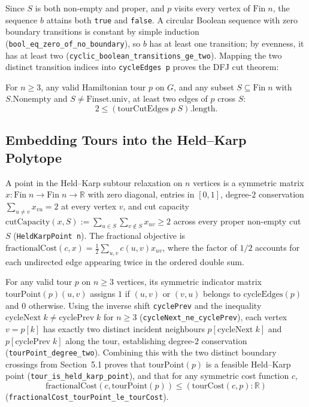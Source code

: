 Since $S$ is both non-empty and proper, and $p$ visits every vertex of $\mathrm{Fin}\;n$, the sequence $b$ attains both \texttt{true} and \texttt{false}. A circular Boolean sequence with zero boundary transitions is constant by simple induction (\texttt{bool\_eq\_zero\_of\_no\_boundary}), so $b$ has at least one transition; by evenness, it has at least two (\texttt{cyclic\_boolean\_transitions\_ge\_two}). Mapping the two distinct transition indices into \texttt{cycleEdges p} proves the DFJ cut theorem:
\begin{theorem}
For $n \ge 3$, any valid Hamiltonian tour $p$ on $G$, and any subset $S \subseteq \mathrm{Fin}\;n$ with $S.\mathrm{Nonempty}$ and $S \ne \mathrm{Finset.univ}$, at least two edges of $p$ cross $S$:
\[
  2 \le (\mathrm{tourCutEdges}\;p\;S).\mathrm{length}.
\]
\end{theorem}

\subsection{Embedding Tours into the Held--Karp Polytope}

A point in the Held--Karp subtour relaxation on $n$ vertices is a symmetric matrix $x : \mathrm{Fin}\;n \to \mathrm{Fin}\;n \to \mathbb{R}$ with zero diagonal, entries in $[0,1]$, degree-$2$ conservation $\sum_{u \ne v} x_{vu} = 2$ at every vertex $v$, and cut capacity $\mathrm{cutCapacity}(x, S) := \sum_{u \in S} \sum_{v \notin S} x_{uv} \ge 2$ across every proper non-empty cut $S$ (\texttt{HeldKarpPoint n}). The fractional objective is $\mathrm{fractionalCost}(c, x) = \frac{1}{2}\sum_{u,v} c(u,v) x_{uv}$, where the factor of $1/2$ accounts for each undirected edge appearing twice in the ordered double sum.

For any valid tour $p$ on $n \ge 3$ vertices, its symmetric indicator matrix $\mathrm{tourPoint}(p)(u,v)$ assigns $1$ if $(u,v)$ or $(v,u)$ belongs to $\mathrm{cycleEdges}(p)$ and $0$ otherwise. Using the inverse shift \texttt{cyclePrev} and the inequality $\mathrm{cycleNext}\;k \ne \mathrm{cyclePrev}\;k$ for $n \ge 3$ (\texttt{cycleNext\_ne\_cyclePrev}), each vertex $v = p[k]$ has exactly two distinct incident neighbours $p[\mathrm{cycleNext}\;k]$ and $p[\mathrm{cyclePrev}\;k]$ along the tour, establishing degree-$2$ conservation (\texttt{tourPoint\_degree\_two}). Combining this with the two distinct boundary crossings from Section~5.1 proves that $\mathrm{tourPoint}(p)$ is a feasible Held--Karp point (\texttt{tour\_is\_held\_karp\_point}), and that for any symmetric cost function $c$,
\[
  \mathrm{fractionalCost}(c, \mathrm{tourPoint}(p)) \le (\mathrm{tourCost}(c, p) : \mathbb{R})
\]
(\texttt{fractionalCost\_tourPoint\_le\_tourCost}).

